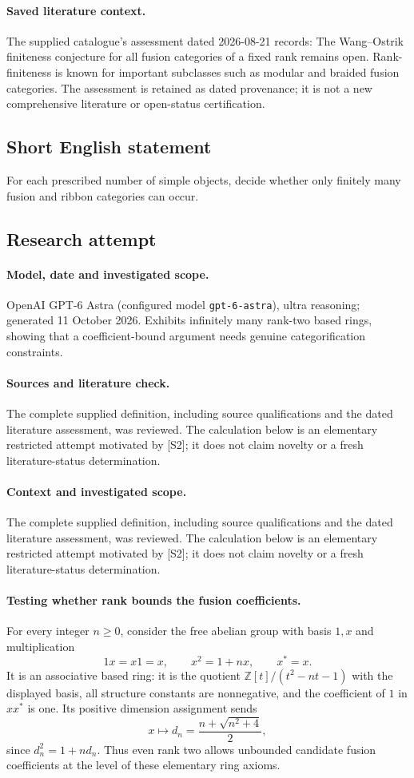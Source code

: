 \documentclass[11pt]{article}
\begin{document}
\paragraph{Saved literature context.} The supplied catalogue's assessment dated 2026-08-21 records: The Wang--Ostrik finiteness conjecture for all fusion categories of a fixed rank remains open. Rank-finiteness is known for important subclasses such as modular and braided fusion categories. The assessment is retained as dated provenance; it is not a new comprehensive literature or open-status certification.
\subsection{Short English statement}
For each prescribed number of simple objects, decide whether only finitely many fusion and ribbon categories can occur.
\subsection{Research attempt}
\paragraph{Model, date and investigated scope.}
OpenAI GPT-6 Astra (configured model \texttt{gpt-6-astra}), ultra reasoning; generated 11 October 2026. Exhibits infinitely many rank-two based rings, showing that a coefficient-bound argument needs genuine categorification constraints.

\paragraph{Sources and literature check.}
The complete supplied definition, including source qualifications and the dated literature assessment, was reviewed. The calculation below is an elementary restricted attempt motivated by [S2]; it does not claim novelty or a fresh literature-status determination.

\paragraph{Context and investigated scope.} The complete supplied definition, including source qualifications and the dated literature assessment, was reviewed. The calculation below is an elementary restricted attempt motivated by [S2]; it does not claim novelty or a fresh literature-status determination.

\paragraph{Testing whether rank bounds the fusion coefficients.} For every integer $n\geq0$, consider the free abelian group with basis $1,x$ and multiplication
\[
 1x=x1=x,\qquad x^2=1+nx,\qquad x^*=x.
\]
It is an associative based ring: it is the quotient $\mathbb Z[t]/(t^2-nt-1)$ with the displayed basis, all structure constants are nonnegative, and the coefficient of $1$ in $xx^*$ is one. Its positive dimension assignment sends
\[
 x\longmapsto d_n=\frac{n+\sqrt{n^2+4}}2,
\]
since $d_n^2=1+nd_n$. Thus even rank two allows unbounded candidate fusion coefficients at the level of these elementary ring axioms.
\end{document}

